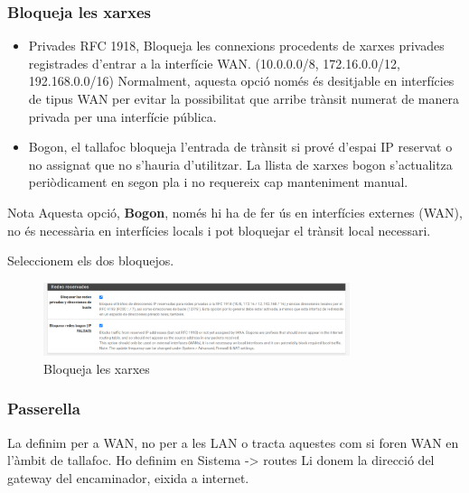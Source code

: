 \documentclass[
  10pt,
]{krantz}
\providecommand{\tightlist}{%
  \setlength{\itemsep}{0pt}\setlength{\parskip}{0pt}}
\begin{document}
\hypertarget{bloqueja-les-xarxes}{%
\subsubsection{Bloqueja les xarxes}\label{bloqueja-les-xarxes}}

\begin{itemize}
\tightlist
\item
  Privades RFC 1918, Bloqueja les connexions procedents de xarxes privades registrades d'entrar a la interfície WAN. (10.0.0.0/8, 172.16.0.0/12, 192.168.0.0/16) Normalment, aquesta opció només és desitjable en interfícies de tipus WAN per evitar la possibilitat que arribe trànsit numerat de manera privada per una interfície pública.
\item
  Bogon, el tallafoc bloqueja l'entrada de trànsit si prové d'espai IP reservat o no assignat que no s'hauria d'utilitzar. La llista de xarxes bogon s'actualitza periòdicament en segon pla i no requereix cap manteniment manual.
\end{itemize}

\begin{rmdtip}{Nota}
Aquesta opció, \textbf{Bogon}, només hi ha de fer ús en interfícies externes (WAN), no és necessària en interfícies locals i pot bloquejar el trànsit local necessari.

\end{rmdtip}

Seleccionem els dos bloquejos.

\begin{figure}
\centering
\includegraphics[width=0.8\textwidth,height=\textheight]{imatges/pfsense_reservado.png}
\caption{Bloqueja les xarxes}
\end{figure}

\hypertarget{passerella}{%
\subsubsection{Passerella}\label{passerella}}

La definim per a WAN, no per a les LAN o tracta aquestes com si foren WAN en l'àmbit de tallafoc. Ho definim en Sistema -\textgreater{} routes Li donem la direcció del gateway del encaminador, eixida a internet.
\end{document}
